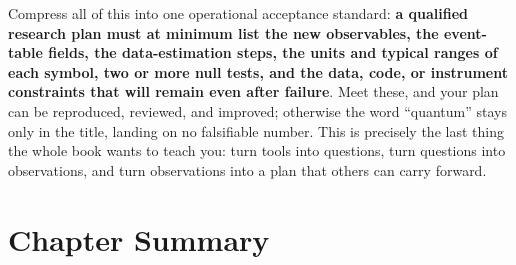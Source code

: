 Compress all of this into one operational acceptance standard: \textbf{a qualified research plan must at minimum list the new observables, the event-table fields, the data-estimation steps, the units and typical ranges of each symbol, two or more null tests, and the data, code, or instrument constraints that will remain even after failure}. Meet these, and your plan can be reproduced, reviewed, and improved; otherwise the word ``quantum'' stays only in the title, landing on no falsifiable number. This is precisely the last thing the whole book wants to teach you: turn tools into questions, turn questions into observations, and turn observations into a plan that others can carry forward.

\section*{Chapter Summary}

